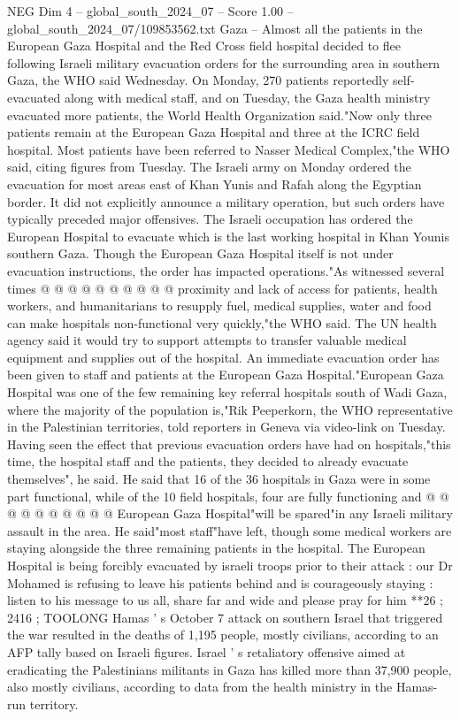 \begin{textsample}{NEG Dim 4 – global\_south\_2024\_07 – Score 1.00 – global\_south\_2024\_07/109853562.txt}  \label{ex:f4_neg_348}
Gaza -- Almost all the patients in the European Gaza Hospital and the Red Cross field hospital decided to flee following Israeli military evacuation orders for the surrounding area in southern Gaza, the WHO said Wednesday.
On Monday, 270 patients reportedly self-evacuated along with medical staff, and on Tuesday, the Gaza health ministry evacuated more patients, the World Health Organization said."Now only three patients remain at the European Gaza Hospital and three at the ICRC field hospital.
Most patients have been referred to Nasser Medical Complex,"the WHO said, citing figures from Tuesday.
The Israeli army on Monday ordered the evacuation for most areas east of Khan Yunis and Rafah along the Egyptian border.
It did not explicitly announce a military operation, but such orders have typically preceded major offensives.
The Israeli occupation has ordered the European Hospital to evacuate which is the last working hospital in Khan Younis southern Gaza.
Though the European Gaza Hospital itself is not under evacuation instructions, the order has impacted operations."As witnessed several times @ @ @ @ @ @ @ @ @ @ proximity and lack of access for patients, health workers, and humanitarians to resupply fuel, medical supplies, water and food can make hospitals non-functional very quickly,"the WHO said.
The UN health agency said it would try to support attempts to transfer valuable medical equipment and supplies out of the hospital.
An immediate evacuation order has been given to staff and patients at the European Gaza Hospital."European Gaza Hospital was one of the few remaining key referral hospitals south of Wadi Gaza, where the majority of the population is,"Rik Peeperkorn, the WHO representative in the Palestinian territories, told reporters in Geneva via video-link on Tuesday.
Having seen the effect that previous evacuation orders have had on hospitals,"this time, the hospital staff and the patients, they decided to already evacuate themselves", he said.
He said that 16 of the 36 hospitals in Gaza were in some part functional, while of the 10 field hospitals, four are fully functioning and @ @ @ @ @ @ @ @ @ @ European Gaza Hospital"will be spared"in any Israeli military assault in the area.
He said"most staff"have left, though some medical workers are staying alongside the three remaining patients in the hospital.
The European Hospital is being forcibly evacuated by israeli troops prior to their attack : our Dr Mohamed is refusing to leave his patients behind and is courageously staying : listen to his message to us all, share far and wide and please pray for him **26 ; 2416 ; TOOLONG Hamas ' s October 7 attack on southern Israel that triggered the war resulted in the deaths of 1,195 people, mostly civilians, according to an AFP tally based on Israeli figures.
Israel ' s retaliatory offensive aimed at eradicating the Palestinians militants in Gaza has killed more than 37,900 people, also mostly civilians, according to data from the health ministry in the Hamas-run territory.

\end{textsample}

